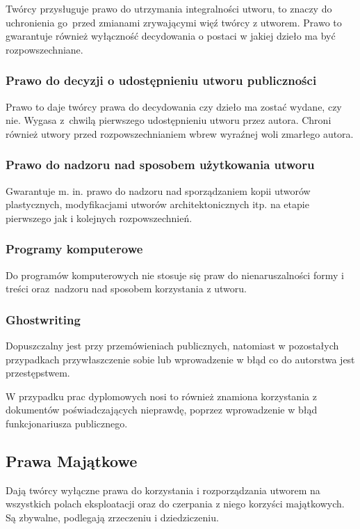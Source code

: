\documentclass{article}
\begin{document}
Twórcy przysługuje prawo do utrzymania integralności utworu, to znaczy do uchronienia go~przed zmianami zrywającymi więź twórcy z utworem.
Prawo to gwarantuje również wyłączność decydowania o postaci w jakiej dzieło ma być rozpowszechniane.

\subsubsection{Prawo do decyzji o udostępnieniu utworu publiczności}

Prawo to daje twórcy prawa do decydowania czy dzieło ma zostać wydane, czy nie. Wygasa z~chwilą pierwszego udostępnieniu utworu przez autora. Chroni również utwory przed rozpowszechnianiem wbrew wyraźnej woli zmarłego autora.

\subsubsection{Prawo do nadzoru nad sposobem użytkowania utworu}

Gwarantuje m. in. prawo do nadzoru nad sporządzaniem kopii utworów plastycznych, modyfikacjami utworów architektonicznych itp. na etapie pierwszego jak i kolejnych rozpowszechnień.

\subsubsection{Programy komputerowe}

Do programów komputerowych nie stosuje się praw do nienaruszalności formy i treści oraz~nadzoru nad sposobem korzystania z utworu.

\subsubsection{Ghostwriting}

Dopuszczalny jest przy przemówieniach publicznych, natomiast w pozostałych przypadkach przywłaszczenie sobie lub wprowadzenie w błąd co do autorstwa jest przestępstwem.

W przypadku prac dyplomowych nosi to również znamiona korzystania z dokumentów poświadczających nieprawdę, poprzez wprowadzenie w błąd funkcjonariusza publicznego.

\subsection{Prawa Majątkowe}

Dają twórcy wyłączne prawa do korzystania i rozporządzania utworem na wszystkich polach eksploatacji oraz do czerpania z niego korzyści majątkowych. Są zbywalne, podlegają zrzeczeniu i dziedziczeniu.
\end{document}
